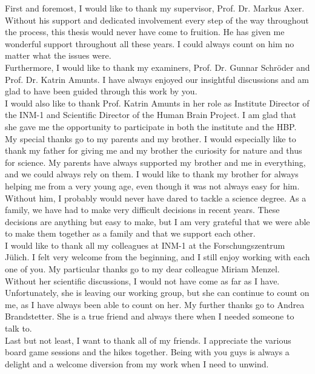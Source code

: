 \label{sec:acknowledgement}
%
First and foremost, I would like to thank my supervisor, Prof. Dr. Markus Axer.
Without his support and dedicated involvement every step of the way throughout the process, this thesis would never have come to fruition.
He has given me wonderful support throughout all these years.
I could always count on him no matter what the issues were.
\\
%
Furthermore, I would like to thank my examiners, Prof. Dr. Gunnar Schr{\"o}der and Prof. Dr. Katrin Amunts.
I have always enjoyed our insightful discussions and am glad to have been guided through this work by you.
\\
%
I would also like to thank Prof. Katrin Amunts in her role as Institute Director of the INM-1 and Scientific Director of the Human Brain Project.
I am glad that she gave me the opportunity to participate in both the institute and the HBP.
\\
%
My special thanks go to my parents and my brother.
I would especially like to thank my father for giving me and my brother the curiosity for nature and thus for science.
My parents have always supported my brother and me in everything, and we could always rely on them.
I would like to thank my brother for always helping me from a very young age, even though it was not always easy for him.
Without him, I probably would never have dared to tackle a science degree.
As a family, we have had to make very difficult decisions in recent years.
These decisions are anything but easy to make, but I am very grateful that we were able to make them together as a family and that we support each other.
\\
%
I would like to thank all my colleagues at INM-1 at the Forschungszentrum J{\"u}lich.
I felt very welcome from the beginning, and I still enjoy working with each one of you.
My particular thanks go to my dear colleague Miriam Menzel.
Without her scientific discussions, I would not have come as far as I have.
Unfortunately, she is leaving our working group, but she can continue to count on me, as I have always been able to count on her.
My further thanks go to Andrea Brandstetter.
She is a true friend and always there when I needed someone to talk to.
\\
%
Last but not least, I want to thank all of my friends.
I appreciate the various board game sessions and the hikes together.
Being with you guys is always a delight and a welcome diversion from my work when I need to unwind. 
% 
% 
% 
\newpage
\pagestyle{empty}
\hfill
\vfill
